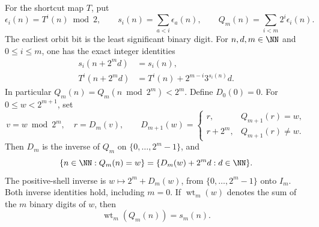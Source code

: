\begin{proposition}
\label{prop:Shaik-parity-decoder}
For the shortcut map \(T\), put
\[
 \epsilon_i(n)=T^i(n)\bmod2,\qquad
 s_i(n)=\sum_{a<i}\epsilon_a(n),\qquad
 Q_m(n)=\sum_{i<m}2^i\epsilon_i(n).
\]
The earliest orbit bit is the least significant binary digit. For
\(n,d,m\in\NN\) and \(0\le i\le m\), one has the exact integer identities
\begin{equation}\label{eq:Shaik-parity-lift}
 \begin{split}
 s_i(n+2^m d)&=s_i(n),\\
 T^i(n+2^m d)&=T^i(n)+2^{m-i}3^{s_i(n)}d .
 \end{split}
\end{equation}
In particular \(Q_m(n)=Q_m(n\bmod2^m)<2^m\).
Define \(D_0(0)=0\). For \(0\le w<2^{m+1}\), set
\[
 v=w\bmod2^m,\quad r=D_m(v),\qquad
 D_{m+1}(w)=
 \begin{cases}
 r,&Q_{m+1}(r)=w,\\
 r+2^m,&Q_{m+1}(r)\ne w .
 \end{cases}
\]
Then \(D_m\) is the inverse of \(Q_m\) on
\(\{0,\ldots,2^m-1\}\), and
\begin{equation}\label{eq:Shaik-parity-fibre}
 \{n\in\NN:Q_m(n)=w\}
   =\{D_m(w)+2^m d:d\in\NN\}.
\end{equation}
The positive-shell inverse is
\(w\mapsto2^m+D_m(w)\), from \(\{0,\ldots,2^m-1\}\) onto \(I_m\).
Both inverse identities hold, including \(m=0\).
If \(\operatorname{wt}_m(w)\) denotes the sum of the \(m\) binary
digits of \(w\), then
\[
 \operatorname{wt}_m(Q_m(n))=s_m(n).
\]
\end{proposition}
